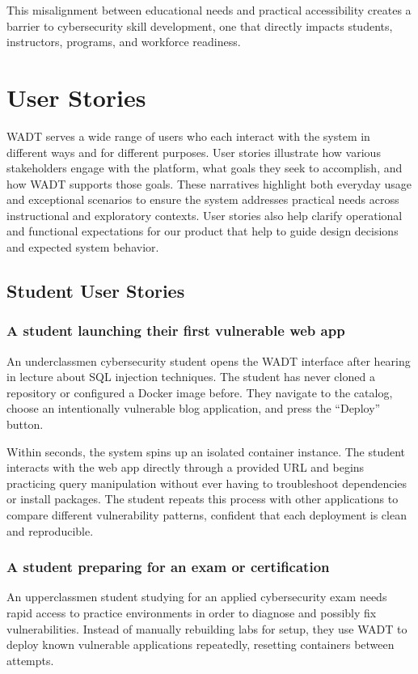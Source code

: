 \documentclass[12pt,titlepage]{article}
\begin{document}
This misalignment between educational needs and practical accessibility creates a barrier to cybersecurity skill development, one that directly impacts students, instructors, programs, and workforce readiness.

\section{User Stories}

WADT serves a wide range of users who each interact with the system in different ways and for different purposes. User stories illustrate how various stakeholders engage with the platform, what goals they seek to accomplish, and how WADT supports those goals. These narratives highlight both everyday usage and exceptional scenarios to ensure the system addresses practical needs across instructional and exploratory contexts. User stories also help clarify operational and functional expectations for our product that help to guide design decisions and expected system behavior.

\subsection{Student User Stories}

\subsubsection*{A student launching their first vulnerable web app}
An underclassmen cybersecurity student opens the WADT interface after hearing in lecture about SQL injection techniques. The student has never cloned a repository or configured a Docker image before. They navigate to the catalog, choose an intentionally vulnerable blog application, and press the “Deploy” button.

Within seconds, the system spins up an isolated container instance. The student interacts with the web app directly through a provided URL and begins practicing query manipulation without ever having to troubleshoot dependencies or install packages. The student repeats this process with other applications to compare different vulnerability patterns, confident that each deployment is clean and reproducible.

\subsubsection*{A student preparing for an exam or certification}
An upperclassmen student studying for an applied cybersecurity exam needs rapid access to practice environments in order to diagnose and possibly fix vulnerabilities. Instead of manually rebuilding labs for setup, they use WADT to deploy known vulnerable applications repeatedly, resetting containers between attempts.
\end{document}
